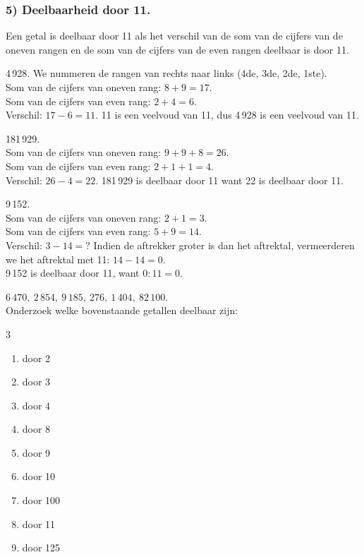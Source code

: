 \documentclass{bis}
\begin{document}
\subsubsection*{5) Deelbaarheid door 11.}
Een getal is deelbaar door 11 als het verschil van de som van de cijfers van de oneven rangen en
de som van de cijfers van de even rangen deelbaar is door 11.

\begin{voorbeeld}
4\,928. We nummeren de rangen van rechts naar links (4de, 3de, 2de, 1ste).\\
Som van de cijfers van oneven rang: $8+9=17$.\\
Som van de cijfers van even rang: $2+4=6$.\\
Verschil: $17-6=11$. 11 is een veelvoud van 11, dus 4\,928 is een veelvoud van 11.
\end{voorbeeld}

\begin{voorbeeld}
181\,929.\\
Som van de cijfers van oneven rang: $9+9+8=26$.\\
Som van de cijfers van even rang: $2+1+1=4$.\\
Verschil: $26-4=22$. 181\,929 is deelbaar door 11 want 22 is deelbaar door 11.
\end{voorbeeld}

\begin{voorbeeld}
9\,152.\\
Som van de cijfers van oneven rang: $2+1=3$.\\
Som van de cijfers van even rang: $5+9=14$.\\
Verschil: $3-14=?$ Indien de aftrekker groter is dan het aftrektal, vermeerderen we het
aftrektal met 11: $14-14=0$.\\
9\,152 is deelbaar door 11, want $0:11=0$.
\end{voorbeeld}

\begin{exercise}
$6\,470,\ 2\,854,\ 9\,185,\ 276,\ 1\,404,\ 82\,100$.\\
Onderzoek welke bovenstaande getallen deelbaar zijn:
\begin{multicols}{3}
\begin{enumerate}
  \item door 2
  \item door 3
  \item door 4
  \item door 8
  \item door 9
  \item door 10
  \item door 100
  \item door 11
  \item door 125
\end{enumerate}
\end{multicols}
\end{exercise}
\end{document}
